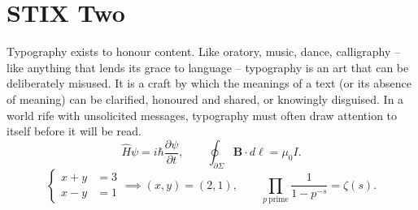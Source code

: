 \documentclass{article}
\begin{document}
\section{STIX Two}
Typography exists to honour content. Like oratory, music, dance, calligraphy -- like anything that lends its grace to language -- typography is an art that can be deliberately misused. It is a craft by which the meanings of a text (or its absence of meaning) can be clarified, honoured and shared, or knowingly disguised. In a world rife with unsolicited messages, typography must often draw attention to itself before it will be read.
\begin{equation}
  \hat{H}\psi = i\hbar\frac{\partial\psi}{\partial t}, \qquad
  \oint_{\partial\Sigma} \mathbf{B}\cdot d\boldsymbol{\ell} = \mu_0 I.
\end{equation}
\[ \left\lbrace \begin{aligned} x+y &= 3\\ x-y &= 1 \end{aligned}\right. \implies
   (x,y) = (2,1), \qquad \prod_{p\ \text{prime}} \frac{1}{1-p^{-s}} = \zeta(s). \]
\end{document}
